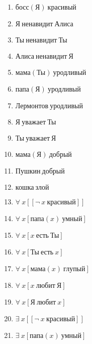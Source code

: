 \documentclass{article}
\begin{document}
\begin{enumerate}
\item $\text{босс}(\text{Я}) \ \text{красивый}$

\item $\text{Я} \ \text{ненавидит} \ \text{Алиса}$

\item $\text{Ты} \ \text{ненавидит} \ \text{Ты}$

\item $\text{Алиса} \ \text{ненавидит} \ \text{Я}$

\item $\text{мама}(\text{Ты}) \ \text{уродливый}$

\item $\text{папа}(\text{Я}) \ \text{уродливый}$

\item $\text{Лермонтов} \ \text{уродливый}$

\item $\text{Я} \ \text{уважает} \ \text{Ты}$

\item $\text{Ты} \ \text{уважает} \ \text{Я}$

\item $\text{мама}(\text{Я}) \ \text{добрый}$

\item $\text{Пушкин} \ \text{добрый}$

\item $\text{кошка} \ \text{злой}$

\item $\forall \ x[[\neg \ x \ \text{красивый}]]$

\item $\forall \ x[\text{папа}(x) \ \text{умный}]$

\item $\forall \ x[x \ \text{есть} \ \text{Ты}]$

\item $\forall \ x[\text{Ты} \ \text{есть} \ x]$

\item $\forall \ x[\text{мама}(x) \ \text{глупый}]$

\item $\forall \ x[x \ \text{любит} \ \text{Я}]$

\item $\forall \ x[\text{Я} \ \text{любит} \ x]$

\item $\exists \ x[[\neg \ x \ \text{красивый}]]$

\item $\exists \ x[\text{папа}(x) \ \text{умный}]$


\end{enumerate}
\end{document}
